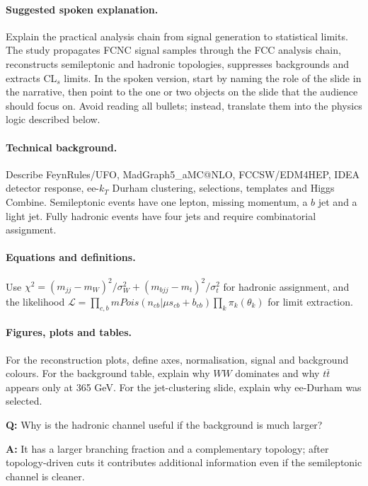 \documentclass[11pt,a4paper]{report}
\newcommand{\ttbar}{t\bar t}
\begin{document}
\paragraph{Suggested spoken explanation.}
Explain the practical analysis chain from signal generation to statistical limits. The study propagates FCNC signal samples through the FCC analysis chain, reconstructs semileptonic and hadronic topologies, suppresses backgrounds and extracts CL$_s$ limits. In the spoken version, start by naming the role of the slide in the narrative, then point to the one or two objects on the slide that the audience should focus on.  Avoid reading all bullets; instead, translate them into the physics logic described below.

\paragraph{Technical background.}
Describe FeynRules/UFO, MadGraph5\_aMC@NLO, FCCSW/EDM4HEP, IDEA detector response, ee-$k_T$ Durham clustering, selections, templates and Higgs Combine.  Semileptonic events have one lepton, missing momentum, a $b$ jet and a light jet.  Fully hadronic events have four jets and require combinatorial assignment.

\paragraph{Equations and definitions.}
Use $\chi^2=(m_{jj}-m_W)^2/\sigma_W^2+(m_{bjj}-m_t)^2/\sigma_t^2$ for hadronic assignment, and the likelihood $\mathcal L=\prod_{c,b}{
m Pois}(n_{cb}|\mu s_{cb}+b_{cb})\prod_k\pi_k(\theta_k)$ for limit extraction.

\paragraph{Figures, plots and tables.}
For the reconstruction plots, define axes, normalisation, signal and background colours.  For the background table, explain why $WW$ dominates and why $\ttbar$ appears only at 365 GeV.  For the jet-clustering slide, explain why ee-Durham was selected.

\begin{questionbox}
\textbf{Q:} Why is the hadronic channel useful if the background is much larger?\par
\textbf{A:} It has a larger branching fraction and a complementary topology; after topology-driven cuts it contributes additional information even if the semileptonic channel is cleaner.
\end{questionbox}
\end{document}
